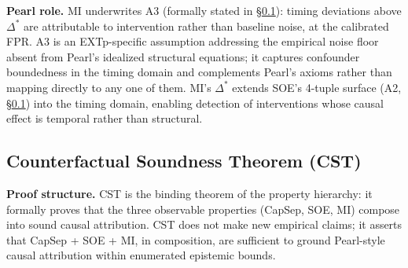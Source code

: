\documentclass[conference]{IEEEtran}
\newcommand{\Dstar}{\Delta^{*}}
\begin{document}
\textbf{Pearl role.} MI underwrites A3 (formally stated in
\S\ref{sec:cst}): timing deviations above $\Dstar$ are attributable
to intervention rather than baseline noise, at the calibrated FPR.
A3 is an EXTp-specific assumption addressing the empirical noise
floor absent from Pearl's idealized structural equations; it
captures confounder boundedness in the timing domain and complements
Pearl's axioms rather than mapping directly to any one of them.
MI's $\Dstar$ extends SOE's 4-tuple surface (A2, \S\ref{sec:cst})
into the timing domain, enabling detection of interventions whose
causal effect is temporal rather than structural.

\subsection{Counterfactual Soundness Theorem (CST)}\label{sec:cst}

\textbf{Proof structure.} CST is the binding theorem of the property
hierarchy: it formally proves that the three observable properties
(CapSep, SOE, MI) compose into sound causal attribution. CST does
not make new empirical claims; it asserts that CapSep + SOE + MI, in
composition, are sufficient to ground Pearl-style causal attribution
within enumerated epistemic bounds.
\end{document}
